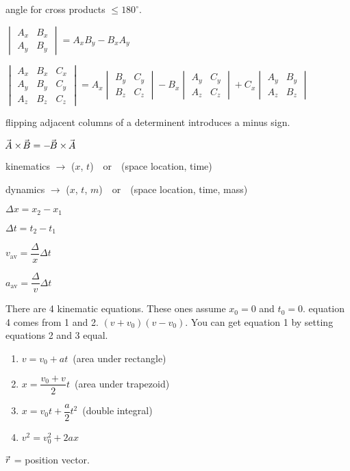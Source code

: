 \documentclass[12pt]{article}
\newcommand \hpx [1]{\hspace{#1px}}
\newcommand \nhpx [1]{\hspace{-#1px}}
\newcommand \av {\mathrm{av}}
\newcommand \Avec {\!\nhpx{-0.5}\vec{\hpx{0.5}A}}
\newcommand \Bvec {\!\vec{\hpx{0.5}B}}
\newcommand \rvec {\nhpx 1 \vec{\hpx 1 r}}
\newcommand \Df [1]{\Delta #1}
\newcommand \Dt {\Df t}
\newcommand \Dv {\Df v}
\newcommand \Dx {\Df x}
\newcommand \DxDt {\dfrac\Dx\Dt}
\newcommand \DvDt {\dfrac\Dv\Dt}
\begin{document}
angle for cross products $\le 180^\circ$.

$\begin{vmatrix}
	A_x & B_x \\
	A_y & B_y
\end{vmatrix} = A_x B_y - B_x A_y$

\vspace{2px}
$\begin{vmatrix}
	A_x & B_x & C_x \\
	A_y & B_y & C_y \\
	A_z & B_z & C_z
\end{vmatrix} = A_x \begin{vmatrix}
	B_y & C_y \\
	B_z & C_z
\end{vmatrix} - B_x \begin{vmatrix}
	A_y & C_y \\
	A_z & C_z
\end{vmatrix} + C_x \begin{vmatrix}
	A_y & B_y \\
	A_z & B_z
\end{vmatrix}$

flipping adjacent columns of a determinent introduces a minus sign.

$\Avec \times \Bvec = -\Bvec \times \Avec$

kinematics $\to$ ($x$, $t$)~~or~~(space location, time)

dynamics $\to$ ($x$, $t$, $m$)~~or~~(space location, time, mass)

\restoregeometry
\pagebreak
$\Dx = x_2 - x_1$

$\Dt = t_2 - t_1$

$v_\av = \DxDt$

$a_\av = \DvDt$

\noindent There are 4 kinematic equations. These ones assume $x_0 = 0$ and $t_0 = 0$. equation 4 comes from 1 and 2. $(v + v_0)(v - v_0)$. You can get equation 1 by setting equations 2 and 3 equal.
\begin{enumerate}
	\item $v = v_0 + at$~(area under rectangle)
	\item $x = \dfrac{v_0 + v}2t$~(area under trapezoid)
	\item $x = v_0t + \dfrac a2t^2$~(double integral)
	\item $v^2 = v_0^2 + 2ax$
\end{enumerate}

$\rvec$ = position vector.
\end{document}
